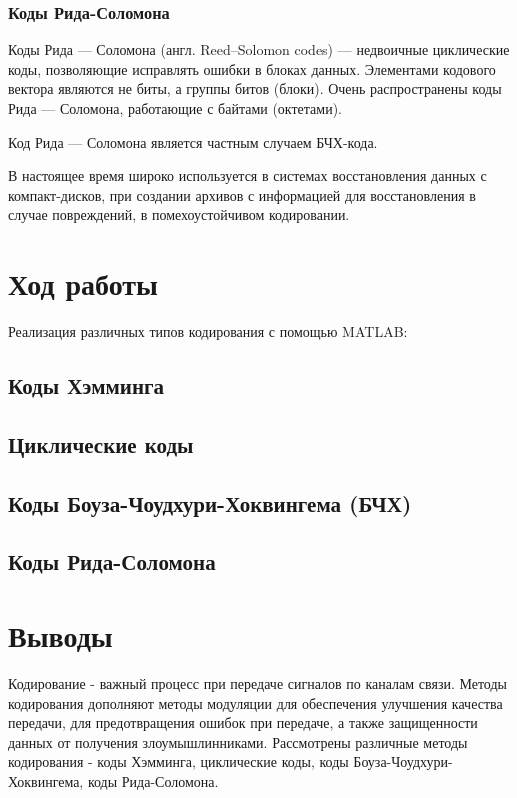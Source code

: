 \subsubsection{Коды Рида-Соломона}
Коды Рида — Соломона (англ. Reed–Solomon codes) — недвоичные циклические коды, позволяющие исправлять ошибки в блоках данных. Элементами кодового вектора являются не биты, а группы битов (блоки). Очень распространены коды Рида — Соломона, работающие с байтами (октетами).

Код Рида — Соломона является частным случаем БЧХ-кода.

В настоящее время широко используется в системах восстановления данных с компакт-дисков, при создании архивов с информацией для восстановления в случае повреждений, в помехоустойчивом кодировании.

\section{Ход работы}

Реализация различных типов кодирования с помощью MATLAB:


\subsection{Коды Хэмминга}

\subsection{Циклические коды}

\subsection{Коды Боуза-Чоудхури-Хоквингема (БЧХ)}

\subsection{Коды Рида-Соломона}


\section{Выводы}
Кодирование - важный процесс при передаче сигналов по каналам связи. Методы кодирования дополняют методы модуляции для обеспечения улучшения качества передачи, для предотвращения ошибок при передаче, а также защищенности данных от получения злоумышлинниками.
Рассмотрены различные методы кодирования - коды Хэмминга, циклические коды, коды Боуза-Чоудхури-Хоквингема, коды Рида-Соломона. 


